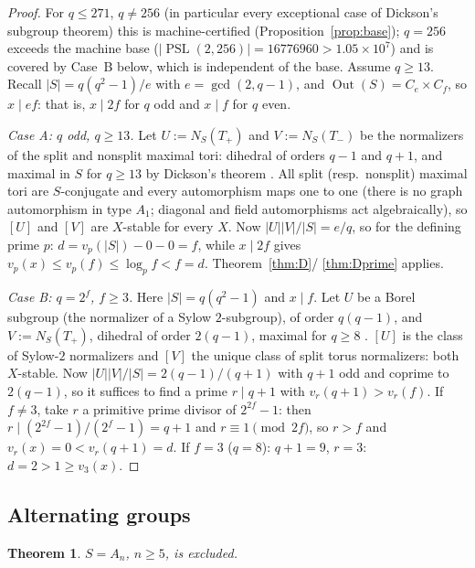 \documentclass[11pt]{amsart}
\newtheorem{theorem}{Theorem}[section]
\theoremstyle{definition}
\theoremstyle{remark}
\DeclareMathOperator{\Out}{Out}
\DeclareMathOperator{\PSL}{PSL}
\newcommand{\vp}[1]{v_{#1}}
\begin{document}
\begin{proof}
For $q\leq271$, $q\neq256$ (in particular every exceptional case of
Dickson's subgroup theorem) this is machine-certified
(Proposition~\ref{prop:base}); $q=256$ exceeds the machine base
($|\PSL(2,256)|=16776960>1.05\times10^7$) and is covered by Case~B
below, which is independent of the base. Assume $q\geq13$. Recall
$|S|=q(q^2-1)/e$ with $e=\gcd(2,q-1)$, and
$\Out(S)=C_e\times C_f$, so $x\mid ef$: that is, $x\mid2f$ for $q$ odd
and $x\mid f$ for $q$ even.

\emph{Case A: $q$ odd, $q\geq13$.} Let $U:=N_S(T_+)$ and $V:=N_S(T_-)$
be the normalizers of the split and nonsplit maximal tori: dihedral of
orders $q-1$ and $q+1$, and maximal in $S$ for $q\geq13$ by Dickson's
theorem \cite{Dickson,Huppert}. All split (resp.\ nonsplit) maximal tori
are $S$-conjugate and every automorphism maps one to one (there is no
graph automorphism in type $A_1$; diagonal and field automorphisms act
algebraically), so $[U]$ and $[V]$ are $X$-stable for every $X$. Now
$|U||V|/|S|=e/q$, so for the defining prime $p$:
$d=\vp{p}(|S|)-0-0=f$, while $x\mid2f$ gives
$\vp{p}(x)\leq\vp{p}(f)\leq\log_pf<f=d$. Theorem~\ref{thm:D}/%
\ref{thm:Dprime} applies.

\emph{Case B: $q=2^f$, $f\geq3$.} Here $|S|=q(q^2-1)$ and $x\mid f$.
Let $U$ be a Borel subgroup (the normalizer of a Sylow $2$-subgroup), of
order $q(q-1)$, and $V:=N_S(T_+)$, dihedral of order $2(q-1)$, maximal
for $q\geq8$ \cite{Dickson,Huppert}. $[U]$ is the class of Sylow-$2$
normalizers and $[V]$ the unique class of split torus normalizers: both
$X$-stable. Now $|U||V|/|S|=2(q-1)/(q+1)$ with $q+1$ odd and coprime to
$2(q-1)$, so it suffices to find a prime $r\mid q+1$ with
$\vp{r}(q+1)>\vp{r}(f)$. If $f\neq3$, take $r$ a primitive prime divisor
of $2^{2f}-1$: then $r\mid(2^{2f}-1)/(2^f-1)=q+1$ and
$r\equiv1\pmod{2f}$, so $r>f$ and $\vp{r}(x)=0<\vp{r}(q+1)=d$. If $f=3$
($q=8$): $q+1=9$, $r=3$: $d=2>1\geq\vp{3}(x)$.
\end{proof}

\subsection{Alternating groups}

\begin{theorem}\label{thm:an}
$S=A_n$, $n\geq5$, is excluded.
\end{theorem}
\end{document}
